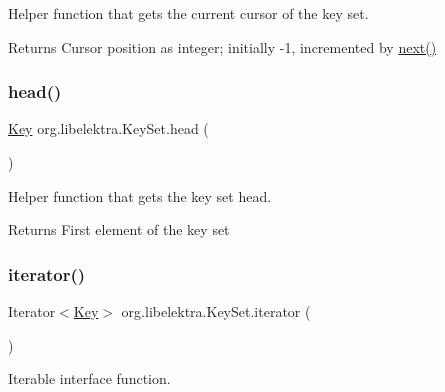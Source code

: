 Helper function that gets the current cursor of the key set. 

\begin{DoxyReturn}{Returns}
Cursor position as integer; initially -\/1, incremented by \hyperlink{classorg_1_1libelektra_1_1KeySet_a92aa593320132e4272602dda29aee2c7}{next()} 
\end{DoxyReturn}
\mbox{\label{classorg_1_1libelektra_1_1KeySet_a11ba1ef1213a9f1ac5743491bc7154e5}} 
\subsubsection{\texorpdfstring{head()}{head()}}
{\footnotesize\ttfamily \hyperlink{classorg_1_1libelektra_1_1Key}{Key} org.\+libelektra.\+Key\+Set.\+head (\begin{DoxyParamCaption}{ }\end{DoxyParamCaption})\hspace{0.3cm}{\ttfamily [inline]}}



Helper function that gets the key set head. 

\begin{DoxyReturn}{Returns}
First element of the key set 
\end{DoxyReturn}
\mbox{\label{classorg_1_1libelektra_1_1KeySet_a1a3b37dff55df600c4fee6bea714a8d9}} 
\subsubsection{\texorpdfstring{iterator()}{iterator()}}
{\footnotesize\ttfamily Iterator$<$\hyperlink{classorg_1_1libelektra_1_1Key}{Key}$>$ org.\+libelektra.\+Key\+Set.\+iterator (\begin{DoxyParamCaption}{ }\end{DoxyParamCaption})\hspace{0.3cm}{\ttfamily [inline]}}



Iterable interface function. 

